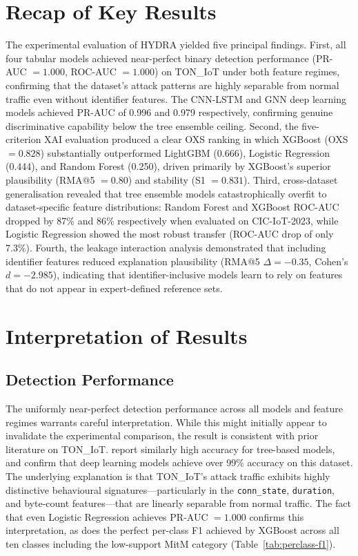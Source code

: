 \documentclass[12pt,a4paper]{report}
\begin{document}
\section{Recap of Key Results}
\label{sec:recap}

The experimental evaluation of HYDRA yielded five principal findings. First, all four tabular models achieved near-perfect binary detection performance (PR-AUC $= 1.000$, ROC-AUC $= 1.000$) on TON\_IoT under both feature regimes, confirming that the dataset's attack patterns are highly separable from normal traffic even without identifier features. The CNN-LSTM and GNN deep learning models achieved PR-AUC of 0.996 and 0.979 respectively, confirming genuine discriminative capability below the tree ensemble ceiling. Second, the five-criterion XAI evaluation produced a clear OXS ranking in which XGBoost (OXS $= 0.828$) substantially outperformed LightGBM (0.666), Logistic Regression (0.444), and Random Forest (0.250), driven primarily by XGBoost's superior plausibility (RMA@5 $= 0.80$) and stability (S1 $= 0.831$). Third, cross-dataset generalisation revealed that tree ensemble models catastrophically overfit to dataset-specific feature distributions: Random Forest and XGBoost ROC-AUC dropped by 87\% and 86\% respectively when evaluated on CIC-IoT-2023, while Logistic Regression showed the most robust transfer (ROC-AUC drop of only 7.3\%). Fourth, the leakage interaction analysis demonstrated that including identifier features reduced explanation plausibility (RMA@5 $\Delta = -0.35$, Cohen's $d = -2.985$), indicating that identifier-inclusive models learn to rely on features that do not appear in expert-defined reference sets.

\section{Interpretation of Results}
\label{sec:interpretation}

\subsection*{Detection Performance}

The uniformly near-perfect detection performance across all models and feature regimes warrants careful interpretation. While this might initially appear to invalidate the experimental comparison, the result is consistent with prior literature on TON\_IoT. \citet{alsaedi2020} report similarly high accuracy for tree-based models, and \citet{ferrag2022} confirm that deep learning models achieve over 99\% accuracy on this dataset. The underlying explanation is that TON\_IoT's attack traffic exhibits highly distinctive behavioural signatures---particularly in the \texttt{conn\_state}, \texttt{duration}, and byte-count features---that are linearly separable from normal traffic. The fact that even Logistic Regression achieves PR-AUC $= 1.000$ confirms this interpretation, as does the perfect per-class F1 achieved by XGBoost across all ten classes including the low-support MitM category (Table~\ref{tab:perclass-f1}).
\end{document}
